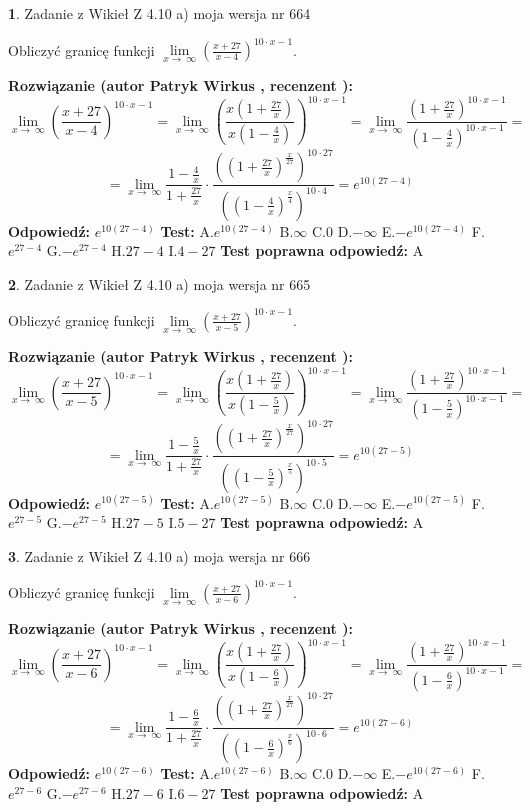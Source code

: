 \documentclass[12pt, a4paper]{article}
\theoremstyle{definition} %
\newtheorem{zad}{}
\newcommand{\zadStart}[1]{\begin{zad}#1\newline}
\newcommand{\zadStop}{\end{zad}}
\newcommand{\rozwStart}[2]{\noindent \textbf{Rozwiązanie (autor #1 , recenzent #2): }\newline}
\newcommand{\rozwStop}{\newline}
\newcommand{\odpStart}{\noindent \textbf{Odpowiedź:}\newline}
\newcommand{\odpStop}{\newline}
\newcommand{\testStart}{\noindent \textbf{Test:}\newline}
\newcommand{\testStop}{\newline}
\newcommand{\kluczStart}{\noindent \textbf{Test poprawna odpowiedź:}\newline}
\newcommand{\kluczStop}{\newline}
\begin{document}
\zadStart{Zadanie z Wikieł Z 4.10 a) moja wersja nr 664}


Obliczyć granicę funkcji  $\lim\limits_{x\to\ \infty}(\frac{x+27}{x-4})^{10\cdot x-1}$.
\zadStop
\rozwStart{Patryk Wirkus}{}
$$\lim\limits_{x\to\ \infty}(\frac{x+27}{x-4})^{10\cdot x-1} = \lim\limits_{x\to\ \infty}(\frac{x(1+\frac{27}{x})}{x(1-\frac{4}{x})})^{10\cdot x-1}=\lim\limits_{x\to\ \infty}\frac{(1+\frac{27}{x})^{10\cdot x-1}}{(1-\frac{4}{x})^{10\cdot x-1}}=$$
$$=\lim\limits_{x\to\ \infty}\frac{1-\frac{4}{x}}{1+\frac{27}{x}}\cdot\frac{((1+\frac{27}{x})^{\frac{x}{27}})^{10\cdot27}}{((1-\frac{4}{x})^{\frac{x}{4}})^{10\cdot4}}=e^{10(27-4)}$$
\rozwStop
\odpStart
$e^{10(27-4)}$
\odpStop
\testStart
A.$e^{10(27-4)}$ B.$\infty$ C.$0$ D.$-\infty$ E.$-e^{10(27-4)}$
F.$e^{27-4}$ G.$-e^{27-4}$
H.$27-4$
I.$4-27$
\testStop
\kluczStart
A
\kluczStop



\zadStart{Zadanie z Wikieł Z 4.10 a) moja wersja nr 665}


Obliczyć granicę funkcji  $\lim\limits_{x\to\ \infty}(\frac{x+27}{x-5})^{10\cdot x-1}$.
\zadStop
\rozwStart{Patryk Wirkus}{}
$$\lim\limits_{x\to\ \infty}(\frac{x+27}{x-5})^{10\cdot x-1} = \lim\limits_{x\to\ \infty}(\frac{x(1+\frac{27}{x})}{x(1-\frac{5}{x})})^{10\cdot x-1}=\lim\limits_{x\to\ \infty}\frac{(1+\frac{27}{x})^{10\cdot x-1}}{(1-\frac{5}{x})^{10\cdot x-1}}=$$
$$=\lim\limits_{x\to\ \infty}\frac{1-\frac{5}{x}}{1+\frac{27}{x}}\cdot\frac{((1+\frac{27}{x})^{\frac{x}{27}})^{10\cdot27}}{((1-\frac{5}{x})^{\frac{x}{5}})^{10\cdot5}}=e^{10(27-5)}$$
\rozwStop
\odpStart
$e^{10(27-5)}$
\odpStop
\testStart
A.$e^{10(27-5)}$ B.$\infty$ C.$0$ D.$-\infty$ E.$-e^{10(27-5)}$
F.$e^{27-5}$ G.$-e^{27-5}$
H.$27-5$
I.$5-27$
\testStop
\kluczStart
A
\kluczStop



\zadStart{Zadanie z Wikieł Z 4.10 a) moja wersja nr 666}


Obliczyć granicę funkcji  $\lim\limits_{x\to\ \infty}(\frac{x+27}{x-6})^{10\cdot x-1}$.
\zadStop
\rozwStart{Patryk Wirkus}{}
$$\lim\limits_{x\to\ \infty}(\frac{x+27}{x-6})^{10\cdot x-1} = \lim\limits_{x\to\ \infty}(\frac{x(1+\frac{27}{x})}{x(1-\frac{6}{x})})^{10\cdot x-1}=\lim\limits_{x\to\ \infty}\frac{(1+\frac{27}{x})^{10\cdot x-1}}{(1-\frac{6}{x})^{10\cdot x-1}}=$$
$$=\lim\limits_{x\to\ \infty}\frac{1-\frac{6}{x}}{1+\frac{27}{x}}\cdot\frac{((1+\frac{27}{x})^{\frac{x}{27}})^{10\cdot27}}{((1-\frac{6}{x})^{\frac{x}{6}})^{10\cdot6}}=e^{10(27-6)}$$
\rozwStop
\odpStart
$e^{10(27-6)}$
\odpStop
\testStart
A.$e^{10(27-6)}$ B.$\infty$ C.$0$ D.$-\infty$ E.$-e^{10(27-6)}$
F.$e^{27-6}$ G.$-e^{27-6}$
H.$27-6$
I.$6-27$
\testStop
\kluczStart
A
\kluczStop
\end{document}
